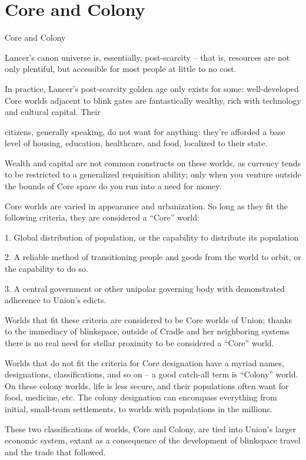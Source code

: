 \chapter{Core and Colony}
Core and Colony

Lancer’s canon universe is, essentially, post-scarcity -- that is, resources are not only plentiful,
but accessible for most people at little to no cost.


In practice, Lancer’s post-scarcity golden age only exists for some: well-developed Core worlds
adjacent to blink gates are fantastically wealthy, rich with technology and cultural capital. Their




citizens, generally speaking, do not want for anything: they’re afforded a base level of housing,
education, healthcare, and food, localized to their state.


Wealth and capital are not common constructs on these worlds, as currency tends to be
restricted to a generalized requisition ability; only when you venture outside the bounds of Core
space do you run into a need for money.


Core worlds are varied in appearance and urbanization. So long as they fit the following criteria,
they are considered a “Core” world:


     1.  Global distribution of population, or the capability to distribute its population

    2.   A reliable method of transitioning people and goods from the world to orbit, or the
         capability to do so.

     3.  A central government or other unipolar governing body with demonstrated adherence to
         Union’s edicts.


Worlds that fit these criteria are considered to be Core worlds of Union; thanks to the immediacy
of blinkspace, outside of Cradle and her neighboring systems there is no real need for stellar
proximity to be considered a “Core” world.


Worlds that do not fit the criteria for Core designation have a myriad names, designations,
classifications, and so on -- a good catch-all term is “Colony” world. On these colony worlds, life
is less secure, and their populations often want for food, medicine, etc. The colony designation
can encompass everything from initial, small-team settlements, to worlds with populations in the
millions.


These two classifications of worlds, Core and Colony, are tied into Union’s larger economic
system, extant as a consequence of the development of blinkspace travel and the trade that
followed.


